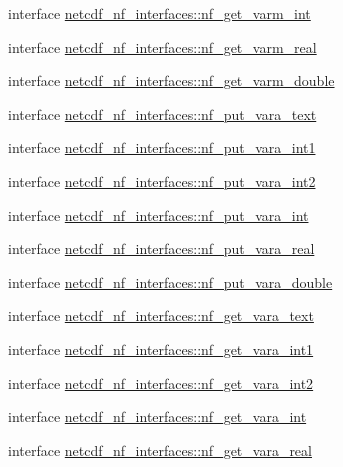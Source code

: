 \begin{DoxyCompactItemize}
\item 
interface \hyperlink{interfacenetcdf__nf__interfaces_1_1nf__get__varm__int}{netcdf\+\_\+nf\+\_\+interfaces\+::nf\+\_\+get\+\_\+varm\+\_\+int}
\item 
interface \hyperlink{interfacenetcdf__nf__interfaces_1_1nf__get__varm__real}{netcdf\+\_\+nf\+\_\+interfaces\+::nf\+\_\+get\+\_\+varm\+\_\+real}
\item 
interface \hyperlink{interfacenetcdf__nf__interfaces_1_1nf__get__varm__double}{netcdf\+\_\+nf\+\_\+interfaces\+::nf\+\_\+get\+\_\+varm\+\_\+double}
\item 
interface \hyperlink{interfacenetcdf__nf__interfaces_1_1nf__put__vara__text}{netcdf\+\_\+nf\+\_\+interfaces\+::nf\+\_\+put\+\_\+vara\+\_\+text}
\item 
interface \hyperlink{interfacenetcdf__nf__interfaces_1_1nf__put__vara__int1}{netcdf\+\_\+nf\+\_\+interfaces\+::nf\+\_\+put\+\_\+vara\+\_\+int1}
\item 
interface \hyperlink{interfacenetcdf__nf__interfaces_1_1nf__put__vara__int2}{netcdf\+\_\+nf\+\_\+interfaces\+::nf\+\_\+put\+\_\+vara\+\_\+int2}
\item 
interface \hyperlink{interfacenetcdf__nf__interfaces_1_1nf__put__vara__int}{netcdf\+\_\+nf\+\_\+interfaces\+::nf\+\_\+put\+\_\+vara\+\_\+int}
\item 
interface \hyperlink{interfacenetcdf__nf__interfaces_1_1nf__put__vara__real}{netcdf\+\_\+nf\+\_\+interfaces\+::nf\+\_\+put\+\_\+vara\+\_\+real}
\item 
interface \hyperlink{interfacenetcdf__nf__interfaces_1_1nf__put__vara__double}{netcdf\+\_\+nf\+\_\+interfaces\+::nf\+\_\+put\+\_\+vara\+\_\+double}
\item 
interface \hyperlink{interfacenetcdf__nf__interfaces_1_1nf__get__vara__text}{netcdf\+\_\+nf\+\_\+interfaces\+::nf\+\_\+get\+\_\+vara\+\_\+text}
\item 
interface \hyperlink{interfacenetcdf__nf__interfaces_1_1nf__get__vara__int1}{netcdf\+\_\+nf\+\_\+interfaces\+::nf\+\_\+get\+\_\+vara\+\_\+int1}
\item 
interface \hyperlink{interfacenetcdf__nf__interfaces_1_1nf__get__vara__int2}{netcdf\+\_\+nf\+\_\+interfaces\+::nf\+\_\+get\+\_\+vara\+\_\+int2}
\item 
interface \hyperlink{interfacenetcdf__nf__interfaces_1_1nf__get__vara__int}{netcdf\+\_\+nf\+\_\+interfaces\+::nf\+\_\+get\+\_\+vara\+\_\+int}
\item 
interface \hyperlink{interfacenetcdf__nf__interfaces_1_1nf__get__vara__real}{netcdf\+\_\+nf\+\_\+interfaces\+::nf\+\_\+get\+\_\+vara\+\_\+real}

\end{DoxyCompactItemize}
